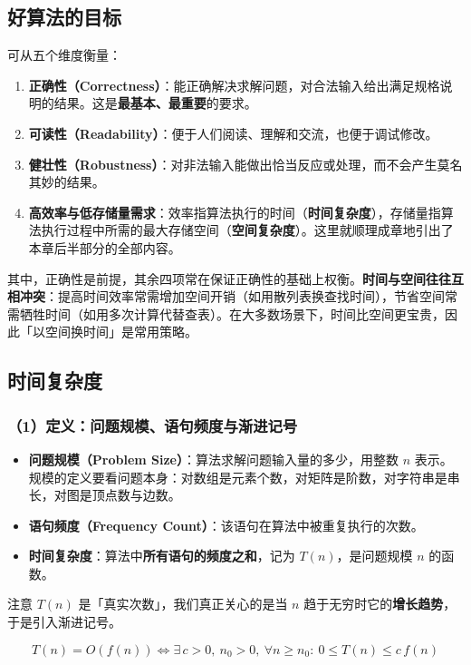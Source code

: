 \documentclass[11pt,openany,UTF8]{ctexbook}
\begin{document}
\subsection{好算法的目标}

可从五个维度衡量：

\begin{enumerate}
\item \textbf{正确性（Correctness）}：能正确解决求解问题，对合法输入给出满足规格说明的结果。这是\textbf{最基本、最重要}的要求。
\item \textbf{可读性（Readability）}：便于人们阅读、理解和交流，也便于调试修改。
\item \textbf{健壮性（Robustness）}：对非法输入能做出恰当反应或处理，而不会产生莫名其妙的结果。
\item \textbf{高效率与低存储量需求}：效率指算法执行的时间（\textbf{时间复杂度}），存储量指算法执行过程中所需的最大存储空间（\textbf{空间复杂度}）。这里就顺理成章地引出了本章后半部分的全部内容。
\end{enumerate}
其中，正确性是前提，其余四项常在保证正确性的基础上权衡。\textbf{时间与空间往往互相冲突}：提高时间效率常需增加空间开销（如用散列表换查找时间），节省空间常需牺牲时间（如用多次计算代替查表）。在大多数场景下，时间比空间更宝贵，因此「以空间换时间」是常用策略。

\subsection{时间复杂度}

\subsubsection{（1）定义：问题规模、语句频度与渐进记号}

\begin{itemize}
\item \textbf{问题规模（Problem Size）}：算法求解问题输入量的多少，用整数 $n$ 表示。规模的定义要看问题本身：对数组是元素个数，对矩阵是阶数，对字符串是串长，对图是顶点数与边数。
\item \textbf{语句频度（Frequency Count）}：该语句在算法中被重复执行的次数。
\item \textbf{时间复杂度}：算法中\textbf{所有语句的频度之和}，记为 $T(n)$，是问题规模 $n$ 的函数。
\end{itemize}
注意 $T(n)$ 是「真实次数」，我们真正关心的是当 $n$ 趋于无穷时它的\textbf{增长趋势}，于是引入渐进记号。

\[T(n) = O(f(n)) \iff \exists\,c>0,\ n_0>0,\ \forall n \ge n_0:\ 0 \le T(n) \le c\,f(n)\]
\end{document}
